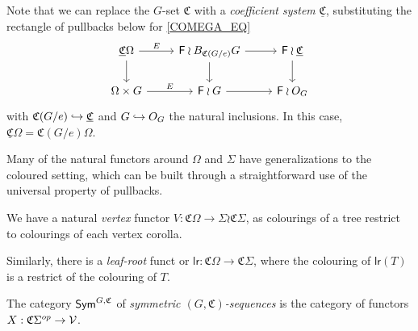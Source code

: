 \documentclass[a4paper,10pt
,draft
]{article}%
\begin{document}
\begin{remark}
      Note that we can replace the $G$-set $\mathfrak C$ with a \textit{coefficient system} $\underline{\mathfrak C}$,
      substituting the rectangle of pullbacks below for \eqref{COMEGA_EQ}
      \begin{equation}
            \begin{tikzcd}
                  \underline{\mathfrak C}\Omega \arrow[d] \arrow[r, "E"]
                  &
                  \mathsf F \wr B_{\mathfrak C(G/e)}G \arrow[r] \arrow[d]
                  &
                  \mathsf F \wr \underline{\mathfrak C} \arrow[d]
                  \\
                  \Omega \times G \arrow[r, "E"]
                  &
                  \mathsf F \wr G \arrow[r]
                  &
                  \mathsf F \wr O_G
            \end{tikzcd}
      \end{equation}
      with $\mathfrak C(G/e) \hookrightarrow \underline{\mathfrak C}$ and $G \hookrightarrow O_G$ the natural inclusions.
      In this case, $\underline{\mathfrak C}\Omega = \mathfrak C(G/e)\Omega$.
\end{remark}

Many of the natural functors around $\Omega$ and $\Sigma$ have generalizations to the coloured setting,
which can be built through a straightforward use of the universal property of pullbacks.

\begin{definition}
      We have a natural \textit{vertex} functor
      $V: \mathfrak C \Omega \to \Sigma \wr \mathfrak C \Sigma$,
      as colourings of a tree restrict to colourings of each vertex corolla.

      Similarly, there is a \textit{leaf-root} funct or
      $\mathsf{lr}: \mathfrak C \Omega \to \mathfrak C \Sigma$,
      where the colouring of $\mathsf{lr}(T)$ is a restrict of the colouring of $T$.
\end{definition}

\begin{definition}
      The category $\mathsf{Sym}^{G,\mathfrak C}$ of \textit{symmetric $(G,\mathfrak C)$-sequences} is
      the category of functors $X: \mathfrak C \Sigma^{op} \to \mathcal V$.
\end{definition}
\end{document}
